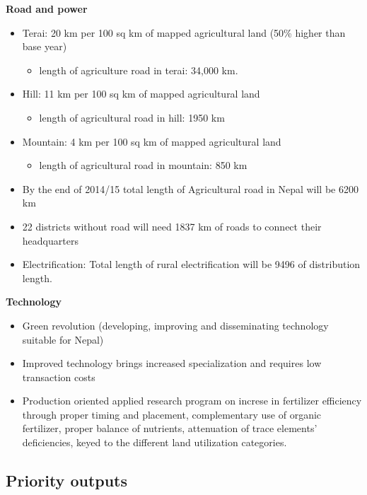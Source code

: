 \documentclass[
  openany]{book}
\providecommand{\tightlist}{%
  \setlength{\itemsep}{0pt}\setlength{\parskip}{0pt}}
\begin{document}
\textbf{Road and power}

\begin{itemize}
\tightlist
\item
  Terai: 20 km per 100 sq km of mapped agricultural land (50\% higher than base year)

  \begin{itemize}
  \tightlist
  \item
    length of agriculture road in terai: 34,000 km.
  \end{itemize}
\item
  Hill: 11 km per 100 sq km of mapped agricultural land

  \begin{itemize}
  \tightlist
  \item
    length of agricultural road in hill: 1950 km
  \end{itemize}
\item
  Mountain: 4 km per 100 sq km of mapped agricultural land

  \begin{itemize}
  \tightlist
  \item
    length of agricultural road in mountain: 850 km
  \end{itemize}
\item
  By the end of 2014/15 total length of Agricultural road in Nepal will be 6200 km
\item
  22 districts without road will need 1837 km of roads to connect their headquarters
\item
  Electrification: Total length of rural electrification will be 9496 of distribution length.
\end{itemize}

\textbf{Technology}

\begin{itemize}
\tightlist
\item
  Green revolution (developing, improving and disseminating technology suitable for Nepal)
\item
  Improved technology brings increased specialization and requires low transaction costs
\item
  Production oriented applied research program on increse in fertilizer efficiency through proper timing and placement, complementary use of organic fertilizer, proper balance of nutrients, attenuation of trace elements' deficiencies, keyed to the different land utilization categories.
\end{itemize}

\hypertarget{priority-outputs}{%
\subsection{Priority outputs}\label{priority-outputs}}
\end{document}
